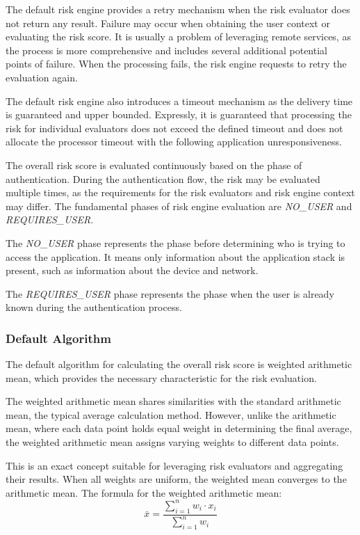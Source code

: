 The default risk engine provides a retry mechanism when the risk evaluator does not return any result.
Failure may occur when obtaining the user context or evaluating the risk score.
It is usually a problem of leveraging remote services, as the process is more comprehensive and includes several additional potential points of failure.
When the processing fails, the risk engine requests to retry the evaluation again.

The default risk engine also introduces a timeout mechanism as the delivery time is guaranteed and upper bounded.
Expressly, it is guaranteed that processing the risk for individual evaluators does not exceed the defined timeout and does not allocate the processor timeout with the following application unresponsiveness.

The overall risk score is evaluated continuously based on the phase of authentication.
During the authentication flow, the risk may be evaluated multiple times, as the requirements for the risk evaluators and risk engine context may differ.
The fundamental phases of risk engine evaluation are \textit{NO\_USER} and \textit{REQUIRES\_USER}. 

The \textit{NO\_USER} phase represents the phase before determining who is trying to access the application.
It means only information about the application stack is present, such as information about the device and network.

The \textit{REQUIRES\_USER} phase represents the phase when the user is already known during the authentication process.

\newpage

\subsubsection{Default Algorithm} \label{risk-engine-algo}
The default algorithm for calculating the overall risk score is weighted arithmetic mean, which provides the necessary characteristic for the risk evaluation.

The weighted arithmetic mean shares similarities with the standard arithmetic mean, the typical average calculation method.
However, unlike the arithmetic mean, where each data point holds equal weight in determining the final average, the weighted arithmetic mean assigns varying weights to different data points.

This is an exact concept suitable for leveraging risk evaluators and aggregating their results.
When all weights are uniform, the weighted mean converges to the arithmetic mean.
\newline
\newline
The formula for the weighted arithmetic mean:
\begin{equation}
\bar{x} = \frac{\sum_{i=1}^{n} w_i \cdot x_i}{\sum_{i=1}^{n} w_i}
\end{equation}

